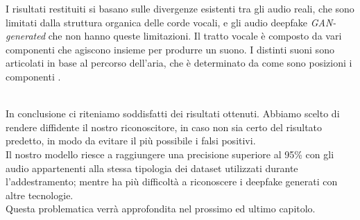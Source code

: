 \documentclass[12pt, a4paper]{article}
\begin{document}
\begin{minipage}{0.6\textwidth}
I risultati restituiti si basano sulle divergenze esistenti tra gli audio reali, che sono limitati dalla struttura organica delle corde vocali, e gli audio deepfake \textit{GAN-generated} che non hanno queste limitazioni. Il tratto vocale è composto da vari componenti che agiscono insieme per produrre un suono. I distinti suoni sono articolati in base al percorso dell'aria, che è determinato da come sono posizioni i componenti \cite{280020}.\\
\end{minipage}
\\
In conclusione ci riteniamo soddisfatti dei risultati ottenuti. Abbiamo scelto di rendere diffidente il nostro riconoscitore, in caso non sia certo del risultato predetto, in modo da evitare il più possibile i falsi positivi.\\ 
Il nostro modello riesce a raggiungere una precisione superiore al 95\% con gli audio appartenenti alla stessa tipologia dei dataset utilizzati durante l'addestramento; mentre ha più difficoltà a riconoscere i deepfake generati con altre tecnologie.\\
Questa problematica verrà approfondita nel prossimo ed ultimo capitolo.
\newpage
\end{document}
